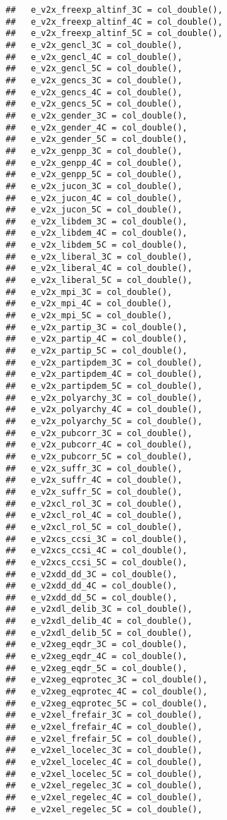\documentclass[
]{article}
\begin{document}
\begin{verbatim}
##   e_v2x_freexp_altinf_3C = col_double(),
##   e_v2x_freexp_altinf_4C = col_double(),
##   e_v2x_freexp_altinf_5C = col_double(),
##   e_v2x_gencl_3C = col_double(),
##   e_v2x_gencl_4C = col_double(),
##   e_v2x_gencl_5C = col_double(),
##   e_v2x_gencs_3C = col_double(),
##   e_v2x_gencs_4C = col_double(),
##   e_v2x_gencs_5C = col_double(),
##   e_v2x_gender_3C = col_double(),
##   e_v2x_gender_4C = col_double(),
##   e_v2x_gender_5C = col_double(),
##   e_v2x_genpp_3C = col_double(),
##   e_v2x_genpp_4C = col_double(),
##   e_v2x_genpp_5C = col_double(),
##   e_v2x_jucon_3C = col_double(),
##   e_v2x_jucon_4C = col_double(),
##   e_v2x_jucon_5C = col_double(),
##   e_v2x_libdem_3C = col_double(),
##   e_v2x_libdem_4C = col_double(),
##   e_v2x_libdem_5C = col_double(),
##   e_v2x_liberal_3C = col_double(),
##   e_v2x_liberal_4C = col_double(),
##   e_v2x_liberal_5C = col_double(),
##   e_v2x_mpi_3C = col_double(),
##   e_v2x_mpi_4C = col_double(),
##   e_v2x_mpi_5C = col_double(),
##   e_v2x_partip_3C = col_double(),
##   e_v2x_partip_4C = col_double(),
##   e_v2x_partip_5C = col_double(),
##   e_v2x_partipdem_3C = col_double(),
##   e_v2x_partipdem_4C = col_double(),
##   e_v2x_partipdem_5C = col_double(),
##   e_v2x_polyarchy_3C = col_double(),
##   e_v2x_polyarchy_4C = col_double(),
##   e_v2x_polyarchy_5C = col_double(),
##   e_v2x_pubcorr_3C = col_double(),
##   e_v2x_pubcorr_4C = col_double(),
##   e_v2x_pubcorr_5C = col_double(),
##   e_v2x_suffr_3C = col_double(),
##   e_v2x_suffr_4C = col_double(),
##   e_v2x_suffr_5C = col_double(),
##   e_v2xcl_rol_3C = col_double(),
##   e_v2xcl_rol_4C = col_double(),
##   e_v2xcl_rol_5C = col_double(),
##   e_v2xcs_ccsi_3C = col_double(),
##   e_v2xcs_ccsi_4C = col_double(),
##   e_v2xcs_ccsi_5C = col_double(),
##   e_v2xdd_dd_3C = col_double(),
##   e_v2xdd_dd_4C = col_double(),
##   e_v2xdd_dd_5C = col_double(),
##   e_v2xdl_delib_3C = col_double(),
##   e_v2xdl_delib_4C = col_double(),
##   e_v2xdl_delib_5C = col_double(),
##   e_v2xeg_eqdr_3C = col_double(),
##   e_v2xeg_eqdr_4C = col_double(),
##   e_v2xeg_eqdr_5C = col_double(),
##   e_v2xeg_eqprotec_3C = col_double(),
##   e_v2xeg_eqprotec_4C = col_double(),
##   e_v2xeg_eqprotec_5C = col_double(),
##   e_v2xel_frefair_3C = col_double(),
##   e_v2xel_frefair_4C = col_double(),
##   e_v2xel_frefair_5C = col_double(),
##   e_v2xel_locelec_3C = col_double(),
##   e_v2xel_locelec_4C = col_double(),
##   e_v2xel_locelec_5C = col_double(),
##   e_v2xel_regelec_3C = col_double(),
##   e_v2xel_regelec_4C = col_double(),
##   e_v2xel_regelec_5C = col_double(),

\end{verbatim}
\end{document}
